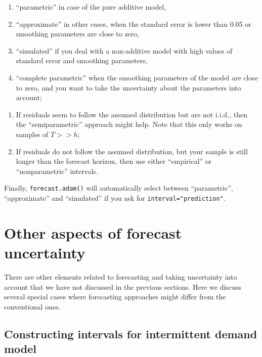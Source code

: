 \documentclass[
]{book}
\providecommand{\tightlist}{%
  \setlength{\itemsep}{0pt}\setlength{\parskip}{0pt}}
\theoremstyle{definition}
\theoremstyle{definition}
\theoremstyle{definition}
\theoremstyle{definition}
\theoremstyle{remark}
\begin{document}
\begin{enumerate}
\def\labelenumi{\alph{enumi}.}
\tightlist
\item
  ``parametric'' in case of the pure additive model,
\item
  ``approximate'' in other cases, when the standard error is lower than 0.05 or smoothing parameters are close to zero,
\item
  ``simulated'' if you deal with a non-additive model with high values of standard error and smoothing parameters,
\item
  ``complete parametric'' when the smoothing parameters of the model are close to zero, and you want to take the uncertainty about the parameters into account;
\end{enumerate}

\begin{enumerate}
\def\labelenumi{\arabic{enumi}.}
\setcounter{enumi}{1}
\tightlist
\item
  If residuals seem to follow the assumed distribution but are not i.i.d., then the ``semiparametric'' approach might help. Note that this only works on samples of \(T>>h\);
\item
  If residuals do not follow the assumed distribution, but your sample is still longer than the forecast horizon, then use either ``empirical'' or ``nonparametric'' intervals.
\end{enumerate}

Finally, \texttt{forecast.adam()} will automatically select between ``parametric'', ``approximate'' and ``simulated'' if you ask for \texttt{interval="prediction"}.

\hypertarget{forecastingADAMOther}{%
\section{Other aspects of forecast uncertainty}\label{forecastingADAMOther}}

There are other elements related to forecasting and taking uncertainty into account that we have not discussed in the previous sections. Here we discuss several special cases where forecasting approaches might differ from the conventional ones.

\hypertarget{constructing-intervals-for-intermittent-demand-model}{%
\subsection{Constructing intervals for intermittent demand model}\label{constructing-intervals-for-intermittent-demand-model}}
\end{document}
